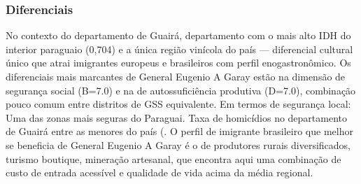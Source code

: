 \subsubsection*{Diferenciais}\label{dif-general-eugenio-a-garay-0404}
No contexto do departamento de Guairá, departamento com o mais alto IDH do interior paraguaio (0,704) e a única região vinícola do país — diferencial cultural único que atrai imigrantes europeus e brasileiros com perfil enogastronômico. Os diferenciais mais marcantes de General Eugenio A Garay estão na dimensão de segurança social (B=7.0) e na de autossuficiência produtiva (D=7.0), combinação pouco comum entre distritos de GSS equivalente. Em termos de segurança local: Uma das zonas mais seguras do Paraguai. Taxa de homicídios no departamento de Guairá entre as menores do país (. O perfil de imigrante brasileiro que melhor se beneficia de General Eugenio A Garay é o de produtores rurais diversificados, turismo boutique, mineração artesanal, que encontra aqui uma combinação de custo de entrada acessível e qualidade de vida acima da média regional.
